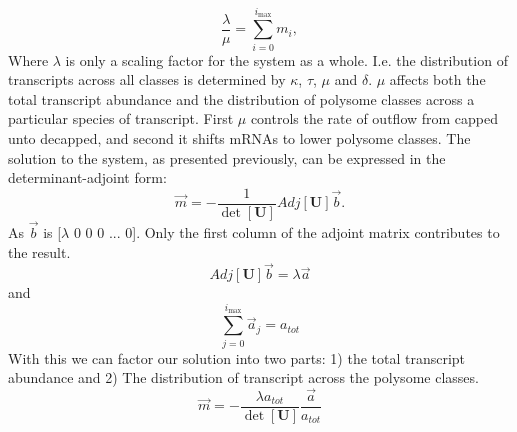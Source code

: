 \documentclass[review]{elsarticle}
\newcommand{\imax}{\ensuremath{{i_{\max}}}\xspace}
\let\bs\boldsymbol
\begin{document}
	\begin{equation}
		\frac{\lambda}{\mu}=\sum_{i=0}^{\imax}m_{i},
	\end{equation}
Where $\lambda$ is only a scaling factor for the system as a whole. I.e. the distribution of transcripts across all classes is determined by $\kappa$, $\tau$, $\mu$ and $\delta$. %
$\mu$ affects both the total transcript abundance and the distribution of polysome classes across a particular species of transcript.
First $\mu$ controls the rate of outflow from capped unto decapped, and second it shifts mRNAs to lower polysome classes.
The solution to the system, as presented previously, can be expressed in the determinant-adjoint form:
	\begin{equation*}
		\vec{m}=-\frac{1}{\det[\bs{U}]}Adj[\bs{U}]\vec{b}.
	\end{equation*}
As $\vec{b}$ is [$\lambda$ 0 0 0 ... 0]. Only the first column of the adjoint matrix contributes to the result. 
	\begin{equation*}
		Adj[\bs{U}]\vec{b} = \lambda\vec{a}
	\end{equation*}	
and
	\begin{equation*}
		\sum_{j=0}^{\imax}\vec{a}_j = a_{tot} 
	\end{equation*}
With this we can factor our solution into two parts: 1) the total transcript abundance and 2) The distribution of transcript across the polysome classes.
	\begin{equation*}
		\vec{m}=-\frac{\lambda a_{tot}}{\det[\bs{U}]} \frac{\vec{a}}{a_{tot}} 
	\end{equation*}
\end{document}
